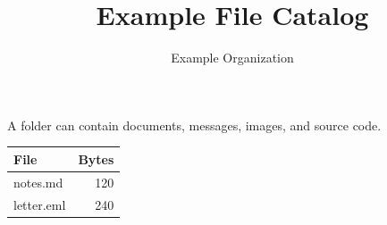 \documentclass{article}
\title{Example File Catalog}
\author{Example Organization}
\date{}
\begin{document}
\maketitle
A folder can contain documents, messages, images, and source code.

\begin{tabular}{lr}
File & Bytes \\
\hline
notes.md & 120 \\
letter.eml & 240 \\
\end{tabular}
\end{document}

